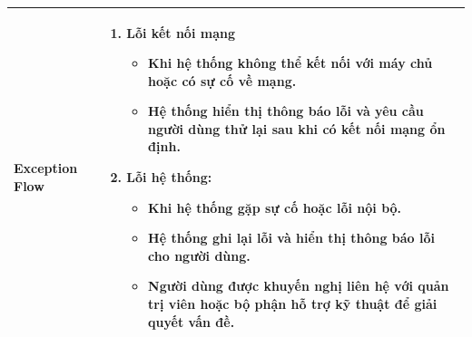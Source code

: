 \begin{longtable}[H]{|l|p{}|}
        \textbf{Exception Flow} & \vspace{-0.75cm} \begin{enumerate}[leftmargin=5.5mm]
            \item Lỗi kết nối mạng
                \begin{itemize}[topsep=0pt]
                    \setlength\itemsep{0em}
                    \item Khi hệ thống không thể kết nối với máy chủ hoặc có sự cố về mạng.
                    \item Hệ thống hiển thị thông báo lỗi và yêu cầu người dùng thử lại sau khi có kết nối mạng ổn định.
                \end{itemize}
            \item Lỗi hệ thống:
                \begin{itemize}[topsep=0pt]
                    \setlength\itemsep{0em}
                    \item Khi hệ thống gặp sự cố hoặc lỗi nội bộ.
                    \item Hệ thống ghi lại lỗi và hiển thị thông báo lỗi cho người dùng.
                    \item Người dùng được khuyến nghị liên hệ với quản trị viên hoặc bộ phận hỗ trợ kỹ thuật để giải quyết vấn đề.
                \end{itemize}
        \end{enumerate}\\
        \hline 
    \end{longtable}
    
